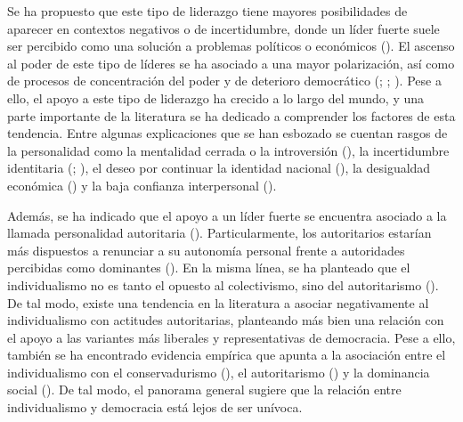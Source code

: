 \documentclass[
  letterpaper,
  DIV=11,
  numbers=noendperiod]{scrartcl}
\begin{document}
Se ha propuesto que este tipo de liderazgo tiene mayores posibilidades
de aparecer en contextos negativos o de incertidumbre, donde un líder
fuerte suele ser percibido como una solución a problemas políticos o
económicos (). El ascenso al
poder de este tipo de líderes se ha asociado a una mayor polarización,
así como de procesos de concentración del poder y de deterioro
democrático (;
;
). Pese a ello, el apoyo a este tipo de liderazgo ha crecido a lo
largo del mundo, y una parte importante de la literatura se ha dedicado
a comprender los factores de esta tendencia. Entre algunas explicaciones
que se han esbozado se cuentan rasgos de la personalidad como la
mentalidad cerrada o la introversión
(), la incertidumbre identitaria (; ), el deseo por
continuar la identidad nacional
(),
la desigualdad económica ()
y la baja confianza interpersonal ().

Además, se ha indicado que el apoyo a un líder fuerte se encuentra
asociado a la llamada personalidad autoritaria
(). Particularmente, los
autoritarios estarían más dispuestos a renunciar a su autonomía personal
frente a autoridades percibidas como dominantes
(). En la misma línea, se ha
planteado que el individualismo no es tanto el opuesto al colectivismo,
sino del autoritarismo (). De tal modo, existe una tendencia en la literatura a
asociar negativamente al individualismo con actitudes autoritarias,
planteando más bien una relación con el apoyo a las variantes más
liberales y representativas de democracia. Pese a ello, también se ha
encontrado evidencia empírica que apunta a la asociación entre el
individualismo con el conservadurismo (), el autoritarismo
() y la
dominancia social (). De
tal modo, el panorama general sugiere que la relación entre
individualismo y democracia está lejos de ser unívoca.
\end{document}
